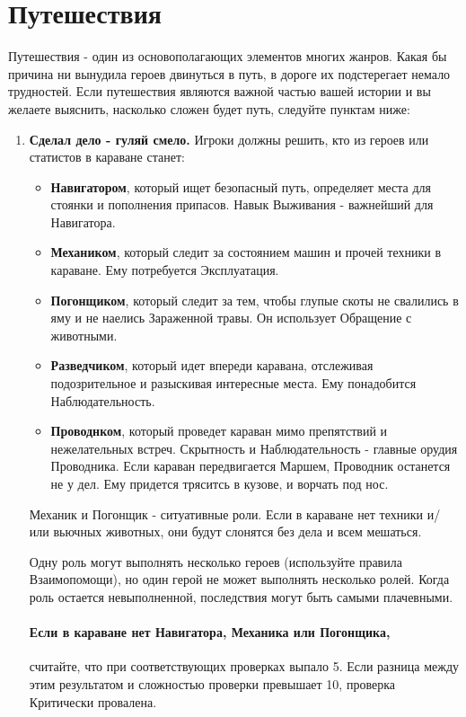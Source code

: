 \section{Путешествия}
Путешествия - один из основополагающих элементов многих жанров. Какая бы причина ни вынудила героев двинуться в путь, в дороге их подстерегает немало трудностей. Если путешествия являются важной частью вашей истории и вы желаете выяснить, насколько сложен будет путь, следуйте пунктам ниже:
\begin{enumerate}
  \item \textbf{Сделал дело - гуляй смело.} Игроки должны решить, кто из героев или статистов в караване станет:
    \begin{itemize}
      \item \textbf{Навигатором}, который ищет безопасный путь, определяет места для стоянки и пополнения припасов. Навык Выживания - важнейший для Навигатора.
      \item \textbf{Механиком}, который следит за состоянием машин и прочей техники в караване. Ему потребуется Эксплуатация.
      \item \textbf{Погонщиком}, который следит за тем, чтобы глупые скоты не свалились в яму и не наелись Зараженной травы. Он использует Обращение с животными.
      \item \textbf{Разведчиком}, который идет впереди каравана, отслеживая подозрительное и разыскивая интересные места. Ему понадобится Наблюдательность.
      \item \textbf{Проводнком}, который проведет караван мимо препятствий и нежелательных встреч. Скрытность и Наблюдательность - главные орудия Проводника. Если караван передвигается Маршем, Проводник останется не у дел. Ему придется тряситсь в кузове, и ворчать под нос.
    \end{itemize}

    \begin{tcolorbox}
      Механик и Погонщик - ситуативные роли. Если в караване нет техники и/ или вьючных животных, они будут слонятся без дела и всем мешаться.
    \end{tcolorbox}
    Одну роль могут выполнять несколько героев (используйте правила Взаимопомощи), но один герой не может выполнять несколько ролей. 
    \newline Когда роль остается невыполненной, последствия могут быть самыми плачевными.
    \paragraph{Если в караване нет Навигатора, Механика или Погонщика,} считайте, что при соответствующих проверках выпало 5. Если разница между этим результатом и сложностью проверки превышает 10, проверка Критически провалена.

\end{enumerate}
